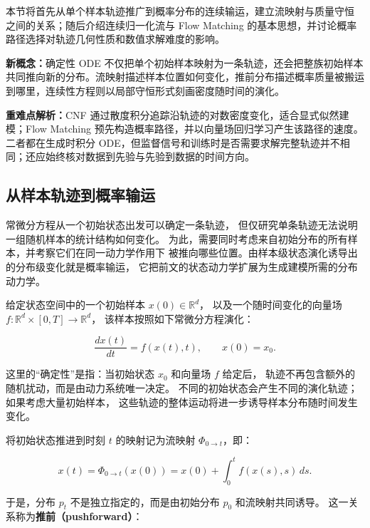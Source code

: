 \documentclass[UTF8,a4paper,zihao=-4,oneside,openany]{ctexbook}
\begin{document}
本节将首先从单个样本轨迹推广到概率分布的连续输运，建立流映射与质量守恒
之间的关系；随后介绍连续归一化流与 Flow Matching 的基本思想，并讨论概率
路径选择对轨迹几何性质和数值求解难度的影响。

\begin{importantnote}
\textbf{新概念：}确定性 ODE 不仅把单个初始样本映射为一条轨迹，还会把整族初始样本共同推向新的分布。流映射描述样本位置如何变化，推前分布描述概率质量被搬运到哪里，连续性方程则以局部守恒形式刻画密度随时间的演化。

\textbf{重难点解析：}CNF 通过散度积分追踪沿轨迹的对数密度变化，适合显式似然建模；Flow Matching 预先构造概率路径，并以向量场回归学习产生该路径的速度。二者都在生成时积分 ODE，但监督信号和训练时是否需要求解完整轨迹并不相同；还应始终核对数据到先验与先验到数据的时间方向。
\end{importantnote}

\subsection{从样本轨迹到概率输运}

常微分方程从一个初始状态出发可以确定一条轨迹，
但仅研究单条轨迹无法说明一组随机样本的统计结构如何变化。
为此，需要同时考虑来自初始分布的所有样本，并考察它们在同一动力学作用下
被推向哪些位置。由样本级状态演化诱导出的分布级变化就是概率输运，
它把前文的状态动力学扩展为生成建模所需的分布动力学。

给定状态空间中的一个初始样本 $x(0)\in\mathbb{R}^d$，
以及一个随时间变化的向量场
$f:\mathbb{R}^d\times[0,T]\rightarrow\mathbb{R}^d$，
该样本按照如下常微分方程演化：

\begin{equation}
\frac{dx(t)}{dt}=f(x(t),t),
\qquad
x(0)=x_0 .
\end{equation}

这里的“确定性”是指：当初始状态 $x_0$ 和向量场 $f$ 给定后，
轨迹不再包含额外的随机扰动，而是由动力系统唯一决定。
不同的初始状态会产生不同的演化轨迹；如果考虑大量初始样本，
这些轨迹的整体运动将进一步诱导样本分布随时间发生变化。

将初始状态推进到时刻 $t$ 的映射记为流映射
$\Phi_{0\rightarrow t}$，即：

\begin{equation}
x(t)
=
\Phi_{0\rightarrow t}(x(0))
=
x(0)+
\int_0^t f(x(s),s)\,ds .
\end{equation}

于是，分布 $p_t$ 不是独立指定的，而是由初始分布 $p_0$ 和流映射共同诱导。
这一关系称为\textbf{推前（pushforward）}：
\end{document}
